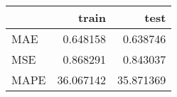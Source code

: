 \begin{tabular}{lrr}
\toprule
{} &      train &       test \\
\midrule
MAE  &   0.648158 &   0.638746 \\
MSE  &   0.868291 &   0.843037 \\
MAPE &  36.067142 &  35.871369 \\
\bottomrule
\end{tabular}
